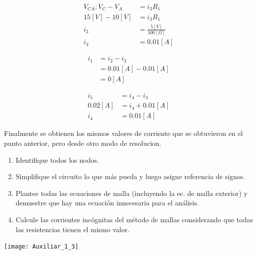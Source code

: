 \documentclass[
  11pt,
  letterpaper,
   addpoints,
   answers
  ]{exam}
\begin{document}
\begin{questions}
\begin{solution}
\begin{enumerate}
\begin{multicols}{2}
        \columnbreak %
    
        \begin{align}
            V_{CA} : V_C - V_A &= i_3 R_1 \\
            15[V] - 10[V] &= i_3 R_1 \\
            i_3 &= \frac{5[V]}{500[\Omega]} \\
            i_3 &= 0.01[A]
        \end{align}
    
        \begin{align}
            i_1 &= i_2 - i_3 \\
                &= 0.01[A] - 0.01[A] \\
                &= 0[A]
        \end{align}
    
        \begin{align}
            i_5 &= i_4 - i_3 \\
            0.02[A] &= i_4 + 0.01[A] \\
            i_4 &= 0.01[A]
        \end{align}
    
    \end{multicols} %
    Finalmente se obtienen los mismos valores de corriente que se obtuvieron en el punto anterior, pero desde otro modo de resolucion.
    \end{enumerate}

\end{solution}
\question \begin{enumerate}
    \item Identifique todos los nodos.
    \item Simplifique el circuito lo que más pueda y luego asigne referencia de signos.
    \item Plantee todas las ecuaciones de malla (incluyendo la ec. de malla exterior) y demuestre que hay una ecuación innecesaria para el análisis.
    \item Calcule las corrientes incógnitas del método de mallas considerando que todas las resistencias tienen el mismo valor.
\end{enumerate}
\begin{center}
    \texttt{[image: Auxiliar\_1\_3]}
\end{center}
\end{questions}
\newpage
\end{document}
